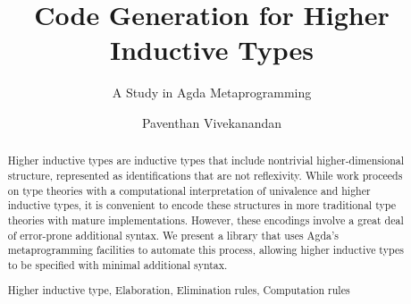 \documentclass[runningheads]{llncs}
\newcommand{\keywords}[1]{\par\addvspace\baselineskip
\noindent\keywordname\enspace\ignorespaces#1}
\begin{document}
\mainmatter  %

\title{Code Generation for Higher Inductive Types}
\subtitle{A Study in Agda Metaprogramming}

%
%
\author{Paventhan Vivekanandan}

%


%
%

\maketitle


\begin{abstract}
Higher inductive types are inductive types that include nontrivial higher-dimensional structure, represented as identifications that are not reflexivity. While work proceeds on type theories with a computational interpretation of univalence and higher inductive types, it is convenient to encode these structures in more traditional type theories with mature implementations. However, these encodings involve a great deal of error-prone additional syntax. We present a library that uses Agda's metaprogramming facilities to automate this process, allowing higher inductive types to be specified with minimal additional syntax.
\keywords{Higher inductive type, Elaboration, Elimination rules, Computation rules}
\end{abstract}
\end{document}
